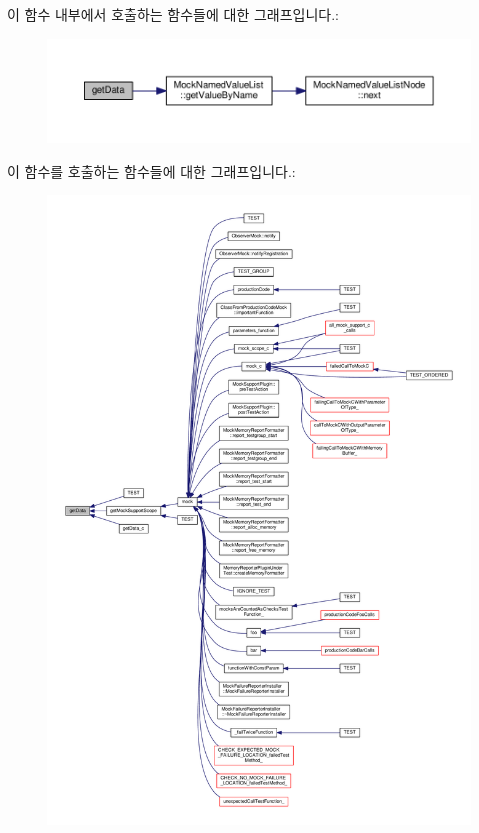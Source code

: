 이 함수 내부에서 호출하는 함수들에 대한 그래프입니다.\+:
\nopagebreak
\begin{figure}[H]
\begin{center}
\leavevmode
\includegraphics[width=350pt]{class_mock_support_a541dfcf28b8737a8a6bb7b548594c9a4_cgraph}
\end{center}
\end{figure}




이 함수를 호출하는 함수들에 대한 그래프입니다.\+:
\nopagebreak
\begin{figure}[H]
\begin{center}
\leavevmode
\includegraphics[width=350pt]{class_mock_support_a541dfcf28b8737a8a6bb7b548594c9a4_icgraph}
\end{center}
\end{figure}


